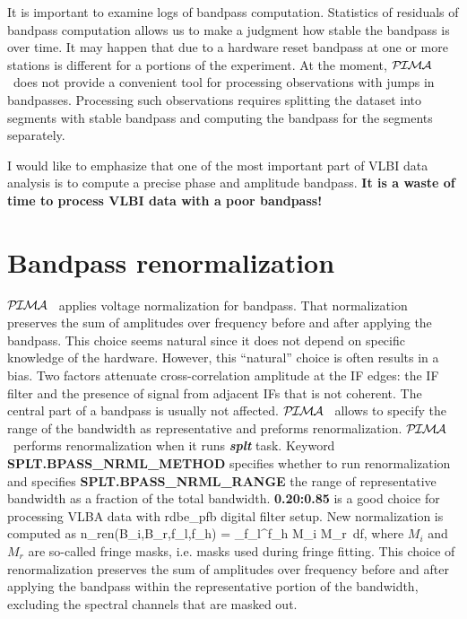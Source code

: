 \documentclass[11pt]{article}
\newcommand{\Blb}[1]{\textcolor{Dblue}{\bf #1}}
\newcommand{\PIMA}{\textcolor{Dgreen}{$\cal P\hspace{-0.067em}I\hspace{-0.067em}M\hspace{-0.067em}A$} }
\begin{document}
  It is important to examine logs of bandpass computation. Statistics
of residuals of bandpass computation allows us to make a judgment how stable 
the bandpass is over time. It may happen that due to a hardware reset 
bandpass at one or more stations is different for a portions of the 
experiment. At the moment, \PIMA\ does not provide a convenient tool for 
processing observations with jumps in bandpasses. Processing such 
observations requires splitting the dataset into segments with stable 
bandpass and computing the bandpass for the segments separately.

  I would like to emphasize that one of the most important part of VLBI 
data analysis is to compute a precise phase and amplitude bandpass. 
{\bf It is a waste of time to process VLBI data with a poor bandpass!}

\section{Bandpass renormalization}

  \PIMA\ applies voltage normalization for bandpass. That normalization
preserves the sum of amplitudes over frequency before and after applying 
the bandpass. This choice seems natural since it does not depend on 
specific knowledge of the hardware. However, this ``natural'' choice
is often results in a bias. Two factors attenuate cross-correlation 
amplitude at the IF edges: the IF filter and the presence of signal 
from adjacent IFs that is not coherent. The central part of a bandpass 
is usually not affected. \PIMA\ allows to specify the range of the 
bandwidth as representative and preforms renormalization. \PIMA\ performs 
renormalization when it runs \Blb{\it splt} task. Keyword 
\Blb{SPLT.BPASS\_NRML\_METHOD} specifies whether to  run renormalization
and specifies \Blb{SPLT.BPASS\_NRML\_RANGE} the range of representative
bandwidth as a fraction of the total bandwidth. \Blb{0.20:0.85} is 
a good choice for processing VLBA data with {\sf rdbe\_pfb} digital
filter setup. New normalization is computed as  
%
\beq
   n_{\rm ren}(B_i,B_r,f_l,f_h) = 
             {\int\limits_{f_l}^{f_h} \; M_i \; M_r\, df},
%
  where $M_i$ and $M_r$ are so-called fringe masks, i.e. masks used during
fringe fitting. This choice of renormalization preserves the sum of amplitudes 
over frequency before and after applying the bandpass within the representative
portion of the bandwidth, excluding the spectral channels that are masked out.
\end{document}
